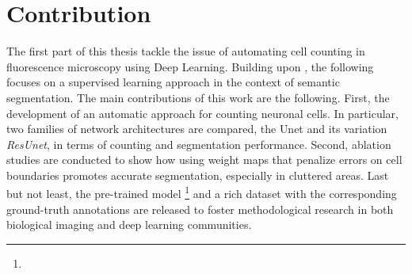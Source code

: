 \section{Contribution}
\label{sec:contribution}
The first part of this thesis tackle the issue of automating cell counting in fluorescence microscopy using Deep Learning. 
Building upon , the following focuses on a supervised learning approach in the context of semantic segmentation.
The main contributions of this work are the following. 
First, the development of an automatic approach for counting neuronal cells. 
In particular, two families of network architectures are compared, the {Unet} and its variation \textit{ResUnet}, in terms of counting and segmentation performance. 
Second, ablation studies are conducted to show how using weight maps that penalize errors on cell boundaries promotes accurate segmentation, especially in cluttered areas.
Last but not least, the pre-trained model%
\footnote{\linkmodel}
and a rich dataset with the corresponding ground-truth annotations \cite{clissa2021fluocells} are released to foster methodological research in both biological imaging and deep learning communities.